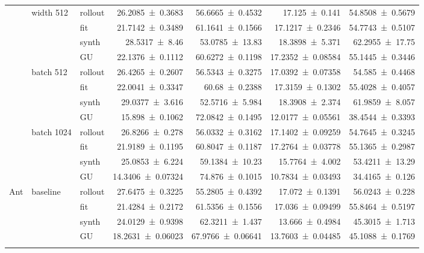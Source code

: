 {\begin{longtable}{@{}lllrrrr@{}}
    \addlinespace[2pt]
     & width 512 & rollout & \num{26.2085+-0.3683} & \num{56.6665+-0.4532} & \num{17.125+-0.141} & \num{54.8508+-0.5679} \\
     &  & fit & \num{21.7142+-0.3489} & \num{61.1641+-0.1566} & \num{17.1217+-0.2346} & \num{54.7743+-0.5107} \\
     &  & synth & \num{28.5317+-8.46} & \num{53.0785+-13.83} & \num{18.3898+-5.371} & \num{62.2955+-17.75} \\
     &  & GU & \num{22.1376+-0.1112} & \num{60.6272+-0.1198} & \num{17.2352+-0.08584} & \num{55.1445+-0.3446} \\
    \addlinespace[2pt]
     & batch 512 & rollout & \num{26.4265+-0.2607} & \num{56.5343+-0.3275} & \num{17.0392+-0.07358} & \num{54.585+-0.4468} \\
     &  & fit & \num{22.0041+-0.3347} & \num{60.68+-0.2388} & \num{17.3159+-0.1302} & \num{55.4028+-0.4057} \\
     &  & synth & \num{29.0377+-3.616} & \num{52.5716+-5.984} & \num{18.3908+-2.374} & \num{61.9859+-8.057} \\
     &  & GU & \num{15.898+-0.1062} & \num{72.0842+-0.1495} & \num{12.0177+-0.05561} & \num{38.4544+-0.3393} \\
    \addlinespace[2pt]
     & batch 1024 & rollout & \num{26.8266+-0.278} & \num{56.0332+-0.3162} & \num{17.1402+-0.09259} & \num{54.7645+-0.3245} \\
     &  & fit & \num{21.9189+-0.1195} & \num{60.8047+-0.1187} & \num{17.2764+-0.03778} & \num{55.1365+-0.2987} \\
     &  & synth & \num{25.0853+-6.224} & \num{59.1384+-10.23} & \num{15.7764+-4.002} & \num{53.4211+-13.29} \\
     &  & GU & \num{14.3406+-0.07324} & \num{74.876+-0.1015} & \num{10.7834+-0.03493} & \num{34.4165+-0.126} \\
    \addlinespace[2pt]
    \midrule
    Ant & baseline & rollout & \num{27.6475+-0.3225} & \num{55.2805+-0.4392} & \num{17.072+-0.1391} & \num{56.0243+-0.228} \\
     &  & fit & \num{21.4284+-0.2172} & \num{61.5356+-0.1556} & \num{17.036+-0.09499} & \num{55.8464+-0.5197} \\
     &  & synth & \num{24.0129+-0.9398} & \num{62.3211+-1.437} & \num{13.666+-0.4984} & \num{45.3015+-1.713} \\
     &  & GU & \num{18.2631+-0.06023} & \num{67.9766+-0.06641} & \num{13.7603+-0.04485} & \num{45.1088+-0.1769} \\
    \addlinespace[2pt]

\end{longtable}}
